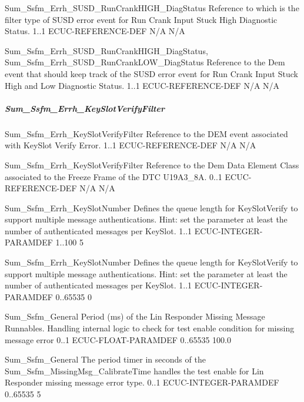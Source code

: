 {  }

{Sum_Ssfm_Errh_SUSD_RunCrankHIGH_DiagStatus}
{Reference to  which is the filter type of SUSD error event for Run Crank Input Stuck High Diagnostic Status.}
{1..1}
{ECUC-REFERENCE-DEF}
{N/A}
{N/A}

{  }

{Sum_Ssfm_Errh_SUSD_RunCrankHIGH_DiagStatus, Sum_Ssfm_Errh_SUSD_RunCrankLOW_DiagStatus}
{Reference to the Dem event that should keep track of the SUSD error event for Run Crank Input Stuck High and Low Diagnostic Status.}
{1..1}
{ECUC-REFERENCE-DEF}
{N/A}
{N/A}


\subparagraph{Sum_Ssfm_Errh_KeySlotVerifyFilter}

{Sum_Ssfm_Errh_KeySlotVerifyFilter}
{Reference to the DEM event associated with KeySlot Verify Error.}
{1..1}
{ECUC-REFERENCE-DEF}
{N/A}
{N/A}

{Sum_Ssfm_Errh_KeySlotVerifyFilter}
{Reference to the Dem Data Element Class associated to the Freeze Frame of the DTC U19A3_8A.}
{0..1}
{ECUC-REFERENCE-DEF}
{N/A}
{N/A}

{Sum_Ssfm_Errh_KeySlotNumber}
{Defines the queue length for KeySlotVerify to support multiple message authentications. Hint: set the parameter at least the number of authenticated messages per KeySlot.}
{1..1}
{ECUC-INTEGER-PARAMDEF}
{1..100}
{5}

{Sum_Ssfm_Errh_KeySlotNumber}
{Defines the queue length for KeySlotVerify to support multiple message authentications. Hint: set the parameter at least the number of authenticated messages per KeySlot.}
{1..1}
{ECUC-INTEGER-PARAMDEF}
{0..65535}
{0}

{Sum_Ssfm_General}
{Period (ms) of the Lin Responder Missing Message Runnables. Handling internal logic to check for test enable condition for missing message error}
{0..1}
{ECUC-FLOAT-PARAMDEF}
{0..65535}
{100.0}

{Sum_Ssfm_General}
{The period timer in seconds of the Sum_Ssfm_MissingMsg_CalibrateTime handles the test enable for Lin Responder missing message error type.}
{0..1}
{ECUC-INTEGER-PARAMDEF}
{0..65535}
{5}

